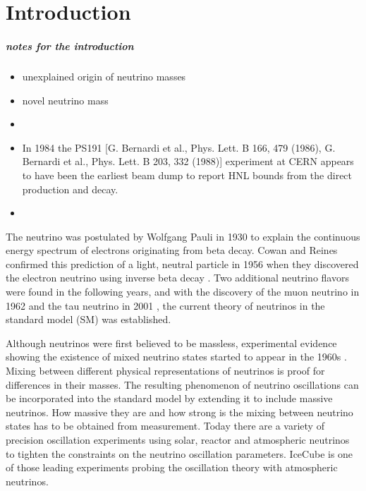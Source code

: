 \setchapterpreamble[u]{\margintoc}

\chapter{Introduction}


\paragraph{notes for the introduction}
\begin{itemize}
    \item unexplained origin of neutrino masses
    \item novel neutrino mass 
    \item 
    \item In 1984 the PS191 [G. Bernardi et al., Phys. Lett. B 166, 479 (1986), G. Bernardi et al., Phys. Lett. B 203, 332 (1988)] experiment at CERN appears to have been the earliest beam dump to report HNL bounds from the direct production and decay.
    \item 
\end{itemize}



The neutrino was postulated by Wolfgang Pauli  in 1930 to explain the continuous energy spectrum of electrons originating from beta decay.
Cowan and Reines confirmed this prediction of a light, neutral particle in 1956 when they discovered the electron neutrino using inverse beta decay .
Two additional neutrino flavors were found in the following years, and with the discovery of the muon neutrino in 1962  and the tau neutrino in 2001 , the current theory of neutrinos in the standard model (SM) was established.

Although neutrinos were first believed to be massless, experimental evidence showing the existence of mixed neutrino states started to appear in the 1960s .
Mixing between different physical representations of neutrinos is proof for differences in their masses.
The resulting phenomenon of neutrino oscillations can be incorporated into the standard model by extending it to include massive neutrinos.
How massive they are and how strong is the mixing between neutrino states has to be obtained from measurement.
Today there are a variety of precision oscillation experiments using solar, reactor and atmospheric neutrinos to tighten the constraints on the neutrino oscillation parameters.
IceCube is one of those leading experiments probing the oscillation theory with atmospheric neutrinos.

